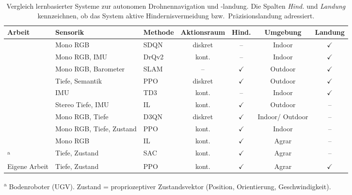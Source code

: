 \begin{table}[htbp]
\centering
\caption[Vergleich lernbasierter Drohnennavigationssysteme]{Vergleich lernbasierter Systeme zur autonomen Drohnennavigation und -landung. Die Spalten \emph{Hind.} und \emph{Landung} kennzeichnen, ob das System aktive Hindernisvermeidung bzw.\ Präzisionslandung adressiert.}
\label{tab:vergleich-sdf}
\footnotesize
\setlength{\tabcolsep}{4pt}
\begin{tabular}{@{}lllcccc@{}}
\toprule
Arbeit & Sensorik & Methode & Aktionsraum & Hind. & Umgebung & Landung \\
\midrule
\textcite{polvaraSimtoRealQuadrotorLanding2020} & Mono RGB & SDQN & diskret & -- & Indoor & $\checkmark$ \\
\textcite{ladoszAutonomousLandingMoving2024} & Mono RGB, IMU & DrQv2 & kont. & -- & Indoor & $\checkmark$ \\
\textcite{yangMonocularVisionSLAMBased2018} & Mono RGB, Barometer & SLAM & -- & $\checkmark$ & Outdoor & $\checkmark$ \\
\textcite{bartolomeiAutonomousEmergencyLanding2022} & Tiefe, Semantik & PPO & diskret & $\checkmark$ & Outdoor & $\checkmark$ \\
\textcite{peterTornadoDroneBioinspiredDRLbased2024} & IMU & TD3 & kont. & -- & Indoor & $\checkmark$ \\
\addlinespace
\textcite{loquercioLearningHighspeedFlight2021} & Stereo Tiefe, IMU & IL & kont. & $\checkmark$ & Outdoor & -- \\
\textcite{kimMonocularVisionbasedAutonomous2022} & Mono RGB, Tiefe & D3QN & diskret & $\checkmark$ & Indoor/ Outdoor & -- \\
\textcite{xuNavRLLearningSafe2024} & Mono RGB, Tiefe, Zustand & PPO & kont. & $\checkmark$ & Indoor & -- \\
\textcite{weiVisionbasedNavigationUnmanned2025} & Mono RGB & IL & kont. & $\checkmark$ & Agrar & -- \\
\textcite{martiniPositionAgnosticAutonomousNavigation2022}\textsuperscript{a} & Tiefe, Zustand & SAC & kont. & $\checkmark$ & Agrar & -- \\
\addlinespace
Eigene Arbeit & Tiefe, Zustand & PPO & kont. & $\checkmark$ & Agrar & $\checkmark$ \\
\bottomrule
\end{tabular}

\smallskip
{\scriptsize
\textsuperscript{a} Bodenroboter (UGV). \quad
Zustand = propriozeptiver Zustandsvektor (Position, Orientierung, Geschwindigkeit).
}
\end{table}

